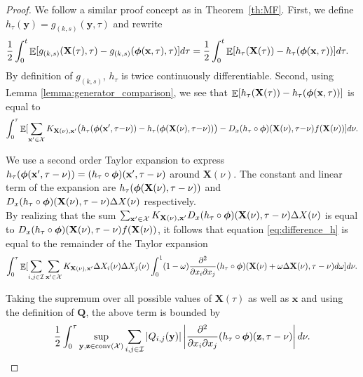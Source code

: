 \documentclass[acmsmall]{acmart}
\newcommand\bx{\mathbf{x}}
\newcommand\bX{\mathbf{X}}
\newcommand\by{\mathbf{y}}
\newcommand\bz{\mathbf{z}}
\newcommand\bphi{\text{\boldmath$\phi$}}
\newcommand\bQ{\mathbf{Q}}
\newcommand\calX{\mathcal{X}}
\newcommand\calI{\mathcal{I}}
\DeclareMathOperator{\E}{\mathbb{E}} %
\newcommand\conv[1]{\mathrm{conv}(#1)}      %
\newcommand\abs[1]{\left|#1\right|}         %
\begin{document}
\begin{proof}

We follow a similar proof concept as in Theorem~\ref{th:MF}. First, we define $h_\tau(\by) = g_{(k,s)}(\by,\tau)$ and rewrite 
\begin{align}
\label{eq:difference_g}
& \frac{1}{2}\int_0^t \E [ g_{(k,s)}(\bX(\tau),\tau) - g_{(k,s)}(\bphi(\bx, \tau),\tau)]d\tau = \frac{1}{2} \int_0^t \E [h_\tau (\bX(\tau)) - h_\tau(\bphi(\bx, \tau))]d\tau. 
\end{align}
By definition of $g_{(k,s)}$, $h_\tau$ is twice continuously differentiable. Second, using Lemma \ref{lemma:generator_comparison}, we see that $\E [h_\tau (\bX(\tau)) - h_\tau(\bphi(\bx, \tau))]$ is equal to 
\begin{align}
  \int_0^\tau \E[ \sum_{\bx'\in \calX} K_{\bX(\nu),\bx'} \bigl( h_\tau(\bphi(\bx',\tau{-}\nu)) -  h_\tau(\bphi(\bX(\nu),\tau{-}\nu)) \bigr) 
  - D_x(h_\tau \circ \bphi)(\bX(\nu),\tau{-}\nu) f(\bX(\nu)) ]d\nu.
  \label{eq:difference_h}
\end{align}


We use a second order Taylor expansion to express $h_\tau(\bphi(\bx',\tau-\nu)) = (h_\tau \circ \bphi)(\bx', \tau - \nu)$ around $\bX(\nu)$. The constant and linear term of the expansion are $h_\tau(\bphi(\bX(\nu),\tau-\nu))$ and \\ $D_x (h_\tau \circ \bphi)(\bX(\nu),\tau-\nu)\Delta X(\nu)$ respectively. \\ By realizing that the sum $\sum_{\bx'\in \calX} K_{\bX(\nu),\bx'}D_x (h_\tau \circ \bphi)(\bX(\nu),\tau-\nu) \Delta X(\nu)$ is equal to $D_x(h_\tau \circ \bphi)(\bX(\nu),\tau-\nu)f(\bX(\nu))$, it follows that equation \eqref{eq:difference_h} is equal to the remainder of the Taylor expansion
\begin{align*}
  \int_0^\tau \E[ \sum_{i,j \in \calI}\sum_{\bx' \in \calX} K_{\bX(\nu),\bx'} \Delta X_i(\nu)\Delta X_j (\nu) \int_0^1 (1-\omega)\frac{\partial^2}{\partial x_i \partial x_j}(h_\tau \circ \bphi)(\bX(\nu) + \omega\Delta \bX(\nu), \tau - \nu) d\omega]d\nu.
\end{align*}

Taking the supremum over all possible values of $\bX(\tau)$ as well as $\bx$ and using the definition of $\bQ$, the above term is bounded by
\begin{align}
\label{eq:bound_refinement_taylor}
\frac{1}{2}\int_0^\tau \sup_{\by,\bz \in \conv{\calX}} \sum_{i,j\in \calI}\abs{Q_{i,j}(\by)}\abs{\frac{\partial^2}{\partial x_i \partial x_j} (h_\tau \circ \bphi)(\bz,\tau-\nu)} d\nu.
\end{align}


\end{proof}
\end{document}
